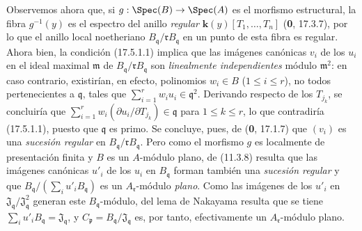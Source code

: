 Observemos ahora que, si $g:\Spec(B)\to\Spec(A)$ es el morfismo estructural, la fibra $g^{-1}(y)$ es el espectro del anillo \emph{regular} $\boldsymbol{k}(y)[T_1,\ldots,T_n]$ (\textbf 0, 17.3.7), por lo que el anillo local noetheriano $B_{\mathfrak q}/\mathfrak rB_{\mathfrak q}$ en un punto de esta fibra es regular. Ahora bien, la condición (17.5.1.1) implica que las imágenes canónicas $v_i$ de los $u_i$ en el ideal maximal $\mathfrak m$ de $B_{\mathfrak q}/\mathfrak rB_{\mathfrak q}$ son \emph{linealmente independientes} módulo $\mathfrak m^2$: en caso contrario, existirían, en efecto, polinomios $w_i\in B$ ($1\leq i\leq r$), no todos pertenecientes a $\mathfrak q$, tales que $\sum_{i=1}^r w_i u_i\in\mathfrak q^2$. Derivando respecto de los $T_{j_k}$, se concluiría que $\sum_{i=1}^r w_i(\partial u_i/\partial T_{j_k})\in\mathfrak q$ para $1\leq k\leq r$, lo que contradiría (17.5.1.1), puesto que $\mathfrak q$ es primo. Se concluye, pues, de (\textbf 0, 17.1.7) que $(v_i)$ es una \emph{sucesión regular} en $B_{\mathfrak q}/\mathfrak rB_{\mathfrak q}$. Pero como el morfismo $g$ es localmente de presentación finita y $B$ es un $A$-módulo plano, de (11.3.8) resulta que las imágenes canónicas $u'_i$ de los $u_i$ en $B_{\mathfrak q}$ forman también una \emph{sucesión regular} y que $B_{\mathfrak q}/(\sum_i u'_iB_{\mathfrak q})$ es un $A_{\mathfrak r}$-módulo \emph{plano}. Como las imágenes de los $u'_i$ en $\mathfrak J_{\mathfrak q}/\mathfrak J_{\mathfrak q}^2$ generan este $B_{\mathfrak q}$-módulo, del lema de Nakayama resulta que se tiene $\sum_i u'_iB_{\mathfrak q}=\mathfrak J_{\mathfrak q}$, y $C_{\mathfrak p}=B_{\mathfrak q}/\mathfrak J_{\mathfrak q}$ es, por tanto, efectivamente un $A_{\mathfrak r}$-módulo plano.


